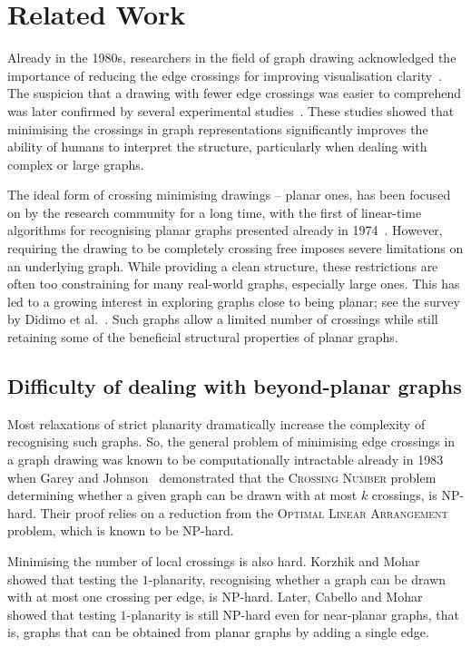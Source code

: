 \chapter{Related Work}\label{ch:related-work}

Already in the 1980s, researchers in the field of graph drawing acknowledged the importance of reducing the edge crossings for improving visualisation clarity~\cite{early-few-crossing}. The suspicion that a drawing with fewer edge crossings was easier to comprehend was later confirmed by several experimental studies~\cite{graph-aesthetic-survey}. These studies showed that minimising the crossings in graph representations significantly improves the ability of humans to interpret the structure, particularly when dealing with complex or large graphs.

The ideal form of crossing minimising drawings -- planar ones, has been focused on by the research community for a long time, with the first of linear-time algorithms for recognising planar graphs presented already in 1974~\cite{linear-p}. However, requiring the drawing to be completely crossing free imposes severe limitations on an underlying graph. While providing a clean structure, these restrictions are often too constraining for many real-world graphs, especially large ones. This has led to a growing interest in exploring graphs close to being planar; see the survey by Didimo et al.~\cite{beyond-planarity-survey}. Such graphs allow a limited number of crossings while still retaining some of the beneficial structural properties of planar graphs.

\section{Difficulty of dealing with beyond-planar graphs}\label{sec:hardness-of-relaxation}

Most relaxations of strict planarity dramatically increase the complexity of recognising such graphs. So, the general problem of minimising edge crossings in a graph drawing was known to be computationally intractable already in 1983 when Garey and Johnson~\cite{cr_NPC} demonstrated that the \textsc{Crossing Number} problem determining whether a given graph can be drawn with at most \(k\) crossings, is NP-hard. Their proof relies on a reduction from the \textsc{Optimal Linear Arrangement} problem, which is known to be NP-hard.

Minimising the number of local crossings is also hard. Korzhik and Mohar~\cite{1p-NPH} showed that testing the \(1\)-planarity, recognising whether a graph can be drawn with at most one crossing per edge, is NP-hard. Later, Cabello and Mohar~\cite{one-edge-NPH} showed that testing \(1\)-planarity is still NP-hard even for near-planar graphs, that is, graphs that can be obtained from planar graphs by adding a single edge.

